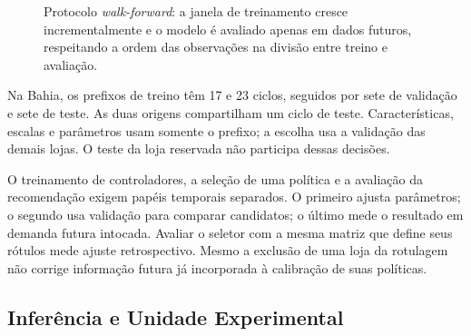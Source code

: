 \begin{figure}[htbp]
\centering
{}
\caption{Protocolo \textit{walk-forward}: a janela de treinamento cresce incrementalmente e o modelo é avaliado apenas em dados futuros, respeitando a ordem das observações na divisão entre treino e avaliação.}
\label{fig:walkforward}
\end{figure}

Na Bahia, os prefixos de treino têm 17 e 23 ciclos, seguidos por sete de validação e sete de teste. As duas origens compartilham um ciclo de teste. Características, escalas e parâmetros usam somente o prefixo; a escolha usa a validação das demais lojas. O teste da loja reservada não participa dessas decisões.

O treinamento de controladores, a seleção de uma política e a avaliação da recomendação exigem papéis temporais separados. O primeiro ajusta parâmetros; o segundo usa validação para comparar candidatos; o último mede o resultado em demanda futura intocada. Avaliar o seletor com a mesma matriz que define seus rótulos mede ajuste retrospectivo. Mesmo a exclusão de uma loja da rotulagem não corrige informação futura já incorporada à calibração de suas políticas.

\subsection{Inferência e Unidade Experimental}

